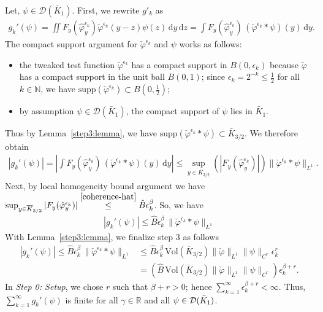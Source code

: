 Let, \(\psi \in \mathcal{D}(\bar K_1)\). First, we rewrite \(g'_k\) as 
\begin{align}\label{gk-formular}
    g_k'(\psi) = \iint F_y(\hat{\varphi}^{\epsilon_k}_{y}) \check \varphi^{\epsilon_k}(y-z) \psi(z) \, \mathrm{d}y \, \mathrm{d}z = \int F_y(\hat \varphi^{\epsilon_k}_y) \, (\check \varphi^{\epsilon_k} * \psi)(y) \, \mathrm{d}y.
\end{align}
The compact support argument for \(\check \varphi^{\epsilon_k}\) and \(\psi\) works as follows: 
\begin{itemize}
    \item the tweaked test function \(\check \varphi^{\epsilon_k}\) has a compact support in \(B(0, \epsilon_k)\) because \(\check \varphi\) has a compact support in the unit ball \(B(0,1)\); since \(\epsilon_k = 2^{-k} \leq \frac{1}{2}\) for all \(k \in \mathbb{N}\), we have \(\mathrm{supp} \left( \check \varphi^{\epsilon_k} \right) \subset B(0,\frac{1}{2})\);
    \item by assumption \(\psi \in \mathcal{D}(\bar K_1)\), the compact support of \(\psi\) lies in \(\bar K_1\).
\end{itemize}
Thus by Lemma~\ref{step3:lemma}, we have \(\mathrm{supp} \left( \check \varphi^{\epsilon_k} * \psi \right) \subset \bar K_{3/2}\). We therefore obtain 
\begin{align*}
    |g_k'(\psi)| = \left|\int F_y(\hat \varphi^{\epsilon_k}_y) \, (\check \varphi^{\epsilon_k} * \psi)(y) \, \mathrm{d}y\right| 
    \leq \sup_{y \in \overline K_{3/2}} \left(|F_y(\hat \varphi^{\epsilon_k}_y)| \right) \lVert \check \varphi^{\epsilon_k} * \psi \rVert_{L^1}.
\end{align*}
Next, by {local homogeneity bound} argument we have \(
    \sup_{y \in \overline K_{3/2}} |F_y(\hat \varphi^{\epsilon_k}_y)|  \overset{\eqref{coherence-hat}}{\leq}  \hat B \epsilon_k^\beta
\). 
So, we have 
\begin{align*}
    |g_k'(\psi)| \leq \hat B \epsilon_k^\beta \, \lVert \check \varphi^{\epsilon_k} * \psi \rVert_{L^1}
\end{align*}
With Lemma~\ref{step3:lemma}, we finalize step 3 as follows 
\begin{align}
    |g_k'(\psi)| \leq \hat B \epsilon_k^\beta \, \lVert \check \varphi^{\epsilon_k} * \psi \rVert_{L^1} &\leq \hat B \epsilon_k^\beta \,  \mathrm{Vol}(\overline K_{3/2})  \lVert \check \varphi \rVert_{L^1} \lVert \psi \rVert_{C^r} \epsilon^r_k \nonumber \\
    &= \left( \hat B \, \mathrm{Vol}(\overline K_{3/2})  \lVert \check \varphi \rVert_{L^1} \lVert \psi \rVert_{C^r} \right)\epsilon^{\beta + r}_k. \label{Mustermkatze}
\end{align}
In \emph{Step 0: Setup}, we chose \(r\) such that  \(\beta + r > 0\); hence \(\sum_{k=1}^\infty \epsilon_k^{\beta + r} < \infty\). Thus, \(\sum^\infty_{k=1} g_k'(\psi)\) is finite for all \(\gamma \in \mathbb{R}\) and all \(\psi \in \mathcal{D}(\bar{K}_{1})\).

